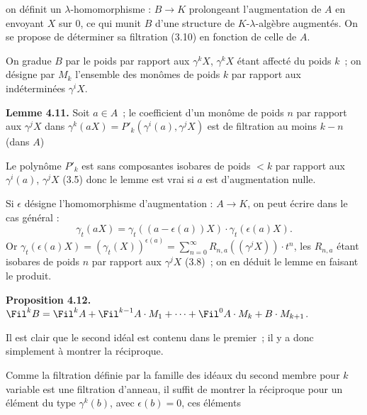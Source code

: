 on
définit un \(\lambda\)-homomorphisme : \(B\to K\) prolongeant l'augmentation de \(A\) en envoyant \(X\) sur \(0\), ce qui munit \(B\) d'une structure de \(K\)-\(\lambda\)-algèbre augmentés. On se propose de déterminer sa filtration (3.10) en fonction de celle de \(A\).

On gradue \(B\) par le poids par rapport aux \(\gamma^k X\), \(\gamma^k X\) étant affecté du poids \(k\)~; on désigne par \(M_k\) l'ensemble des monômes de poids \(k\) par rapport aux indéterminées \(\gamma^i X\).

\textbf{Lemme 4.11.} Soit \(a\in A\)~; le coefficient d'un monôme de poids \(n\) par rapport aux \(\gamma^j X\) dans \(\gamma^k(aX)=P'_k(\gamma^i(a),\gamma^j X)\) est de filtration au moins \(k-n\) (dans \(A\))

Le polynôme \(P'_k\) est sans composantes isobares de poids \(<k\) par rapport aux \(\gamma^i(a)\), \(\gamma^j X\) (3.5) donc le lemme est vrai si \(a\) est d'augmentation nulle.

Si \(\epsilon\) désigne l'homomorphisme d'augmentation : \(A\to K\), on peut écrire dans le cas général :
\[
  \gamma_t(aX)=\gamma_t((a-\epsilon(a))X)\cdot\gamma_t(\epsilon(a)X).
\]
Or \(\gamma_t(\epsilon(a)X)=(\gamma_t(X))^{\epsilon(a)}=\sum_{n=0}^{\infty}R_{n,a}((\gamma^j X))\cdot t^n\), les \(R_{n,a}\) étant isobares de poids \(n\) par rapport aux \(\gamma^j X\) (3.8)~; on en déduit le lemme en faisant le produit.

\textbf{Proposition 4.12.} \(\Fil^k B=\Fil^k A+\Fil^{k-1}A\cdot M_1+\cdots+\Fil^0 A\cdot M_k+B\cdot M_{k+1}\).

Il est clair que le second idéal est contenu dans le premier~; il y a donc simplement à montrer la réciproque.

Comme la filtration définie par la famille des idéaux du second membre pour \(k\) variable est une filtration d'anneau, il suffit de montrer la réciproque pour un élément du type \(\gamma^k(b)\), avec \(\epsilon(b)=0\), ces éléments
